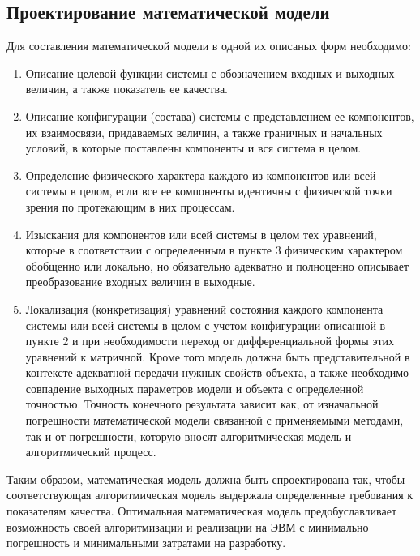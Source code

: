 \subsection{Проектирование математической модели}
Для составления математической модели в одной их описаных форм необходимо:
\begin{enumerate}
	\item Описание целевой функции системы с обозначением входных и выходных
		величин, а также показатель ее качества.
	\item Описание конфигурации (состава) системы с представлением ее компонентов,
		их взаимосвязи, придаваемых величин, а также граничных и начальных условий,
		в которые поставлены компоненты и вся система в целом.
	\item Определение физического характера каждого из компонентов или всей
		системы в целом, если все ее компоненты идентичны с физической точки зрения
		по протекающим в них процессам.
	\item Изыскания для компонентов или всей системы в целом тех уравнений,
		которые в соответствии с определенным в пункте 3 физическим характером
		обобщенно или локально, но обязательно адекватно и полноценно описывает
		преобразование входных величин в выходные.
	\item Локализация (конкретизация) уравнений состояния каждого компонента
		системы или всей системы в целом с учетом конфигурации описанной в пункте 2
		и при необходимости переход от дифференциальной формы этих уравнений к
		матричной. Кроме того модель должна быть представительной в контексте
		адекватной передачи нужных свойств объекта, а также необходимо совпадение
		выходных параметров модели и объекта с определенной точностью. Точность
		конечного результата зависит как, от изначальной погрешности математической
		модели связанной с применяемыми методами, так и от погрешности, которую
		вносят алгоритмическая модель и алгоритмический процесс.
\end{enumerate}\par
Таким образом, математическая модель должна быть спроектирована так, чтобы
соответствующая алгоритмическая модель выдержала определенные требования к
показателям качества. Оптимальная математическая модель предобуславливает
возможность своей алгоритмизации и реализации на ЭВМ с минимально погрешность и
минимальными затратами на разработку.
